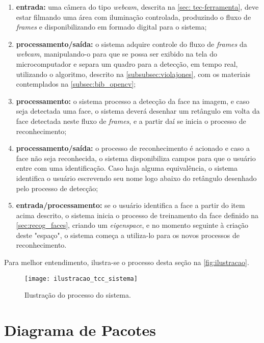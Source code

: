 \begin{enumerate}
	\item \textbf{entrada:} uma câmera do tipo \textit{webcam}, descrita na \autoref{sec: tec-ferramenta}, deve estar filmando uma área com iluminação controlada, produzindo o fluxo de \textit{frames} e disponibilizando em formado digital para o sistema;
	
	\item \textbf{processamento/saída:} o sistema adquire controle do fluxo de \textit{frames} da \textit{webcam}, manipulando-o para que se possa ser exibido na tela do microcomputador e separa um quadro para a detecção, em tempo real, utilizando o algoritmo, descrito na \autoref{subsubsec:violajones}, com os materiais contemplados na \autoref{subsec:bib_opencv};
	
	\item \textbf{processamento:} o sistema processo a detecção da face na imagem, e caso seja detectada uma face, o sistema deverá desenhar um retângulo em volta da face detectada neste fluxo de \textit{frames}, e a partir daí se inicia o processo de reconhecimento;
	
	\item \textbf{processamento/saída:} o processo de reconhecimento é acionado e caso a face não seja reconhecida, o sistema disponibiliza campos para que o usuário entre com uma identificação. Caso haja alguma equivalência, o sistema identifica o usuário escrevendo seu nome logo abaixo do retângulo desenhado pelo processo de detecção;
	
	\item \textbf{entrada/processamento:} se o usuário identifica a face a partir do item acima descrito, o sistema inicia o processo de treinamento da face definido na \autoref{sec:recog_faces}, criando um \textit{eigenspace}, e no momento seguinte à criação deste "espaço", o sistema começa a utiliza-lo para os novos processos de reconhecimento.
\end{enumerate}

Para melhor entendimento, ilustra-se o processo desta seção na \autoref{fig:ilustracao}.

\begin{figure}[h]
	\centering
	\texttt{[image: ilustracao\_tcc\_sistema]}
	\caption{Ilustração do processo do sistema.}
	\label{fig:ilustracao}
\end{figure}


\section{Diagrama de Pacotes}\label{sec:diagpacs}


